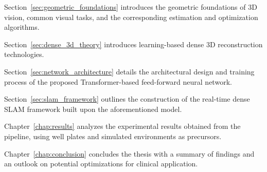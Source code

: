 Section~\ref{sec:geometric_foundations} introduces the geometric foundations of 3D vision, common visual tasks, and the corresponding estimation and optimization algorithms.

Section~\ref{sec:dense_3d_theory} introduces learning-based dense 3D reconstruction technologies.

Section~\ref{sec:network_architecture} details the architectural design and training process of the proposed Transformer-based feed-forward neural network.

Section~\ref{sec:slam_framework} outlines the construction of the real-time dense SLAM framework built upon the aforementioned model.

Chapter~\ref{chap:results} analyzes the experimental results obtained from the pipeline, using well plates and simulated environments as precursors.

Chapter~\ref{chap:conclusion} concludes the thesis with a summary of findings and an outlook on potential optimizations for clinical application.
